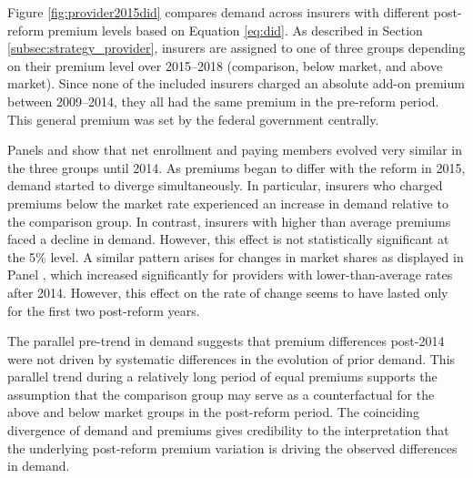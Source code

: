 \documentclass[a4paper, 11pt, english]{article}
\begin{document}
Figure \ref{fig:provider2015did} compares demand across insurers with different post-reform premium levels based on Equation \eqref{eq:did}. As described in Section \ref{subsec:strategy_provider}, insurers are assigned to one of three groups depending on their premium level over 2015--2018 (comparison, below market, and above market). Since none of the included insurers charged an absolute add-on premium between 2009--2014, they all had the same premium in the pre-reform period. This general premium was set by the federal government centrally.

Panels  and  show that net enrollment and paying members evolved very similar in the three groups until 2014. As premiums began to differ with the reform in 2015, demand started to diverge simultaneously. In particular, insurers who charged premiums below the market rate experienced an increase in demand relative to the comparison group. In contrast, insurers with higher than average premiums faced a decline in demand. However, this effect is not statistically significant at the 5\% level. A similar pattern arises for changes in market shares as displayed in Panel , which increased significantly for providers with lower-than-average rates after 2014. However, this effect on the rate of change seems to have lasted only for the first two post-reform years.

The parallel pre-trend in demand suggests that premium differences post-2014 were not driven by systematic differences in the evolution of prior demand. This parallel trend during a relatively long period of equal premiums supports the assumption that the comparison group may serve as a counterfactual for the above and below market groups in the post-reform period. The coinciding divergence of demand and premiums gives credibility to the interpretation that the underlying post-reform premium variation is driving the observed differences in demand.
\end{document}
